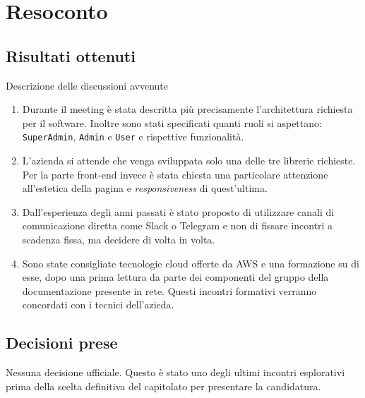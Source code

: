 \section{Resoconto}

\subsection{Risultati ottenuti}
Descrizione delle discussioni avvenute
\begin{enumerate}
    \item Durante il meeting è stata descritta più precisamente l'architettura richiesta per il software. Inoltre sono stati specificati quanti ruoli si aspettano: \texttt{SuperAdmin}, \texttt{Admin} e \texttt{User} e rispettive funzionalità.
    \item L'azienda si attende che venga  sviluppata solo una delle tre librerie richieste. Per la parte front-end invece è stata chiesta una particolare attenzione all'estetica della pagina e \textit{responsiveness} di quest'ultima.
    \item Dall'esperienza degli anni passati è stato proposto di utilizzare canali di comunicazione diretta come Slack o Telegram e non di fissare incontri a scadenza fissa, ma decidere di volta in volta.
    \item Sono state consigliate tecnologie cloud offerte da AWS e una formazione su di esse, dopo una prima lettura da parte dei componenti del gruppo della documentazione presente in rete. Questi incontri formativi verranno concordati con i tecnici dell'azieda.
\end{enumerate}

\subsection{Decisioni prese}
Nessuna decisione ufficiale. Questo è stato uno degli ultimi incontri esplorativi prima della scelta definitiva del capitolato per presentare la candidatura.